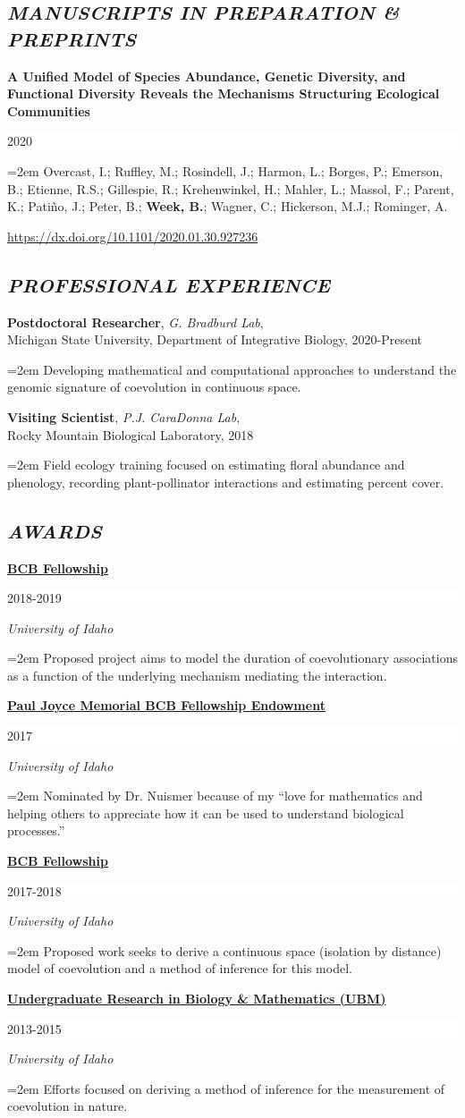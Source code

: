 \documentclass[paper=a4,fontsize=11pt]{scrartcl} %
\newlength{\spacebox}
\newcommand{\sepspace}{\vspace*{1em}}		%
\newcommand{\NewPart}[1]{\subsection*{\uppercase{#1}}}
\newcommand{\PersonalEntry}[2]{
\noindent\hangindent=2em\hangafter=0 %
\parbox{\spacebox}{        %
\textit{#1}}		       %
\hspace{1.5em} #2 \par}    %
\newcommand{\ExpEntry}[5]{      %
\noindent \textbf{#1}, \textit{#2}, #3, \hfill #4  \par        %
\noindent\hangindent=2em\hangafter=0 \small #5 %
\normalsize \par}
\newcommand{\EducationEntry}[4]{
\noindent \textbf{#1} \hfill      %
\colorbox{White}{%
\parbox{6em}{%
\hfill\color{Black}#2}} \par  %
\noindent \textit{#3} \par        %
\noindent\hangindent=2em\hangafter=0 \small #4 %
\normalsize \par}
\newcommand{\InPrepWithDoi}[4]{
\noindent \textbf{#1} \hfill      %
\colorbox{White}{%
\parbox{6em}{%
\hfill\color{Black}#2}} \par      %
\noindent\hangindent=2em\hangafter=0 \small #3 \par         %
\hfill #4        %
\normalsize \par}
\begin{document}
\NewPart{\emph{Manuscripts in Preparation \& Preprints}}{}

\InPrepWithDoi{A Unified Model of Species Abundance, Genetic Diversity, and Functional Diversity Reveals the Mechanisms Structuring Ecological Communities}{2020}{Overcast, I.; Ruffley, M.; Rosindell, J.; Harmon, L.; Borges, P.; Emerson, B.; Etienne, R.S.; Gillespie, R.; Krehenwinkel, H.; Mahler, L.; Massol, F.; Parent, K.; Pati\~{n}o, J.; Peter, B.; \textbf{Week, B.}; Wagner, C.; Hickerson, M.J.; Rominger, A.}{\url{https://dx.doi.org/10.1101/2020.01.30.927236}}

\NewPart{\emph{Professional Experience}}{}

\ExpEntry{Postdoctoral Researcher}{G. Bradburd Lab}{\\Michigan State University, Department of Integrative Biology}{2020-Present}{Developing mathematical and computational approaches to understand the genomic signature of coevolution in continuous space.}

\ExpEntry{Visiting Scientist}{P.J. CaraDonna Lab}{\\Rocky Mountain Biological Laboratory}{2018}{Field ecology training focused on estimating floral abundance and phenology, recording plant-pollinator interactions and estimating percent cover.}

\NewPart{\emph{Awards}}{}

\EducationEntry{\href{https://www.uidaho.edu/sci/bcb/student-resources/bcb-fellowship}{BCB Fellowship}}{2018-2019}{University of Idaho}{Proposed project aims to model the duration of coevolutionary associations as a function of the underlying mechanism mediating the interaction.}
\sepspace
\EducationEntry{\href{https://www.uidaho.edu/news/archive/faculty-staff-news/2016-april/042516-pauljoyce}{Paul Joyce Memorial BCB Fellowship Endowment}}{2017}{University of Idaho}{Nominated by Dr. Nuismer because of my ``love for mathematics and helping others to appreciate how it can be used to understand biological processes.''}
\sepspace
\EducationEntry{\href{https://www.uidaho.edu/sci/bcb/student-resources/bcb-fellowship}{BCB Fellowship}}{2017-2018}{University of Idaho}{Proposed work seeks to derive a continuous space (isolation by distance) model of coevolution and a method of inference for this model.}
\sepspace
\EducationEntry{\href{https://vivo.nkn.uidaho.edu/vivo/display/g1029485}{Undergraduate Research in Biology \& Mathematics (UBM)}}{2013-2015}{University of Idaho}{Efforts focused on deriving a method of inference for the measurement of coevolution in nature.}
\end{document}
